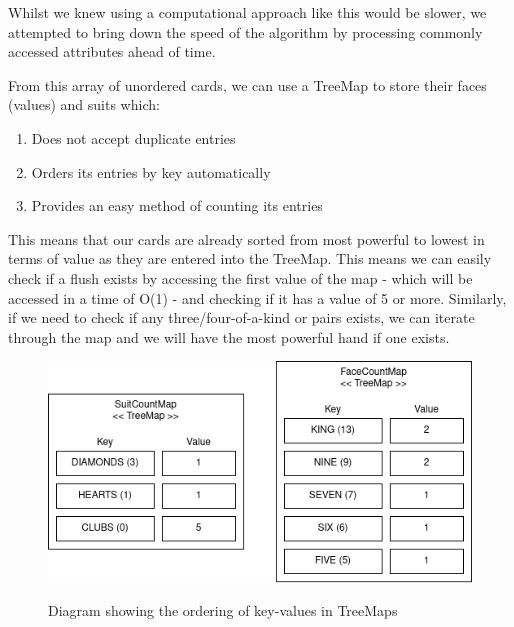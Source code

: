 \documentclass[11pt]{article}
\begin{document}
Whilst we knew using a computational approach like this would be slower, we attempted to bring down the speed of the algorithm by processing commonly accessed attributes ahead of time.\\

\setlength{\fboxrule}{0pt}
\noindent{}%

\vspace{8pt}
From this array of unordered cards, we can use a TreeMap to store their faces (values) and suits which: 
\begin{enumerate}
	\item Does not accept duplicate entries
	\item Orders its entries by key automatically
	\item Provides an easy method of counting its entries
\end{enumerate}

\vspace{8pt}

This means that our cards are already sorted from most powerful to lowest in terms of value as they are entered into the TreeMap. This means we can easily check if a flush exists by accessing the first value of the map - which will be accessed in a time of O(1) - and checking if it has a value of 5 or more. Similarly, if we need to check if any three/four-of-a-kind or pairs exists, we can iterate through the map and we will have the most powerful hand if one exists. 

\begin{figure}[h]
\begin{center}
\includegraphics[scale=0.6]{treemaps} \\
\caption{Diagram showing the ordering of key-values in TreeMaps}
\end{center}

\end{figure}
\end{document}
